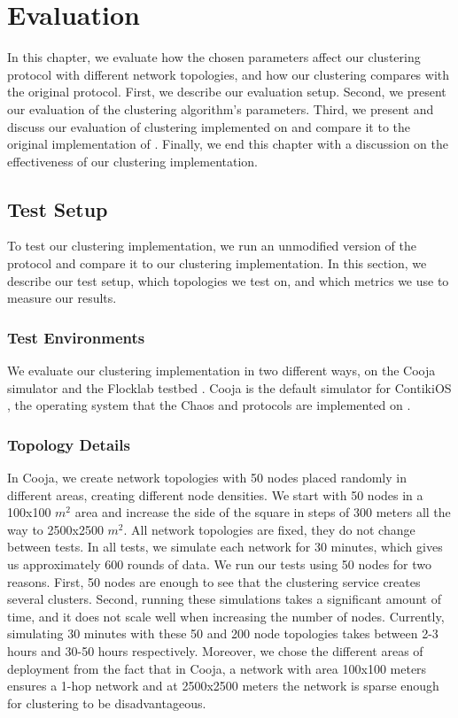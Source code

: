 \chapter{Evaluation}
\label{chap:evaluation}
In this chapter, we evaluate how the chosen parameters affect our clustering protocol with different network topologies, and how our clustering compares with the original \atwo{} protocol. First, we describe our evaluation setup. Second, we present our evaluation of the clustering algorithm's parameters. Third, we present and discuss our evaluation of clustering implemented on \atwo{} and compare it to the original implementation of \atwo{}. Finally, we end this chapter with a discussion on the effectiveness of our clustering implementation.

\section{Test Setup}
To test our clustering implementation, we run an unmodified version of the \atwo{} protocol and compare it to our clustering implementation. In this section, we describe our test setup, which topologies we test on, and which metrics we use to measure our results. 


\subsection{Test Environments}
We evaluate our clustering implementation in two different ways, on the Cooja simulator \cite{Osterlind2006-cooja-introduction} and the Flocklab testbed \cite{Lim2013-flocklab-introduction}. Cooja is the default simulator for ContikiOS \cite{Dunkels2004-contiki-introduction}, the operating system that the Chaos and \atwo{} protocols are implemented on \cite{chaos-introduction-paper, a2-introduction-paper}.

\subsection{Topology Details}
\label{subsec:evaluation-topology-details}
In Cooja, we create network topologies with 50 nodes placed randomly in different areas, creating different node densities. We start with 50 nodes in a 100x100 $m^2$ area and increase the side of the square in steps of 300 meters all the way to 2500x2500 $m^2$. All network topologies are fixed, they do not change between tests. In all tests, we simulate each network for 30 minutes, which gives us approximately 600 rounds of data. We run our tests using 50 nodes for two reasons. First, 50 nodes are enough to see that the clustering service creates several clusters. Second, running these simulations takes a significant amount of time, and it does not scale well when increasing the number of nodes. Currently, simulating 30 minutes with these 50 and 200 node topologies takes between 2-3 hours and 30-50 hours respectively. Moreover, we chose the different areas of deployment from the fact that in Cooja, a network with area 100x100 meters ensures a 1-hop network and at 2500x2500 meters the network is sparse enough for clustering to be disadvantageous.

